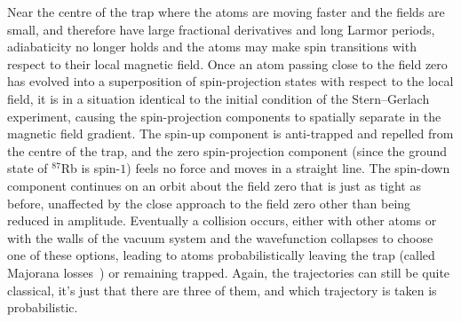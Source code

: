 Near the centre of the trap where the atoms are moving faster and the fields are small, and therefore have large fractional derivatives and long Larmor periods, adiabaticity no longer holds and the atoms may make spin transitions with respect to their local magnetic field. Once an atom passing close to the field zero has evolved into a superposition of spin-projection states with respect to the local field, it is in a situation identical to the initial condition of the Stern--Gerlach experiment, causing the spin-projection components to spatially separate in the magnetic field gradient. The spin-up component is anti-trapped and repelled from the centre of the trap, and the zero spin-projection component (since the ground state of $^{87}$Rb is spin-$1$) feels no force and moves in a straight line. The spin-down component continues on an orbit about the field zero that is just as tight as before, unaffected by the close approach to the field zero other than being reduced in amplitude. Eventually a collision occurs, either with other atoms or with the walls of the vacuum system and the wavefunction collapses to choose one of these options, leading to atoms probabilistically leaving the trap (called Majorana losses~\cite{Majorana1932, PhysRevLett.74.3352}) or remaining trapped. Again, the trajectories can still be quite classical, it's just that there are three of them, and which trajectory is taken is probabilistic.

